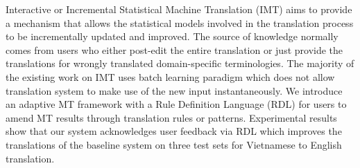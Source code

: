 Interactive or Incremental Statistical Machine Translation (IMT) aims to provide a mechanism that allows the statistical models involved in the translation process to be incrementally updated and improved. The source of knowledge normally comes from users who either post-edit the entire translation or just provide the translations for wrongly translated domain-specific terminologies. The majority of the existing work on IMT uses batch learning paradigm which does not allow translation system to make use of the new input instantaneously. We introduce an adaptive MT framework with a Rule Definition Language (RDL) for users to amend MT results through translation rules or patterns. Experimental results show that our system acknowledges user feedback via RDL which improves the translations of the baseline system on three test sets for Vietnamese to English translation.
